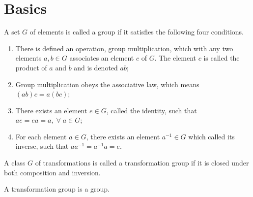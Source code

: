 \section{Basics}

\begin{definition}
	A set $G$ of elements is called a group if it satisfies the following four conditions.
	\begin{enumerate}
		\item There is defined an operation, group multiplication, which with any two elements $a,b\in G$ associates an element $c$ of $G$. The element $c$ is called the product of $a$ and $b$ and is denoted $ab$;
		\item Group multiplication obeys the associative law, which means $(ab)c=a(bc)$;
		\item There exists an element $e\in G$, called the identity, such that $ae=ea=a,\;\forall\;a\in G$;
		\item For each element $a\in G$, there exists an element $a^{-1}\in G$ which called its inverse, such that $aa^{-1}=a^{-1}a=e$.
	\end{enumerate}
\end{definition}

\begin{definition}
	A class $G$ of transformations is called a transformation group if it is closed under both composition and inversion.
\end{definition}
\begin{theorem}
	A transformation group is a group.
\end{theorem}

